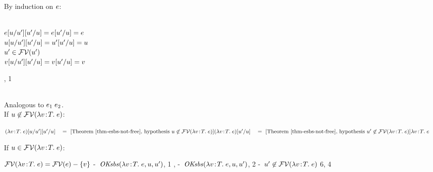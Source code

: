 By induction on $e$:
\begin{bycase}
\Case{$\opO$, $\descopO$, $\pjop{\fnam}$}\\
$e[u/u'][u'/u]=
 e[u'/u]=
 e$
\Case{$\varI$}\\
$u[u/u'][u'/u]=
 u'[u'/u]=
 u$
\\
$u'\in\mathcal{FV}(u')$
\\
$v[u/u'][u'/u]=
 v[u'/u]=
 v$
\Case{$\appO$}
\begin{derivation}
     {, 1}
\steP
{
 \linK{=}
     {}
 \appO}
\end{derivation}
\Case{$\eqO$, $\iifO$}\\
Analogous to $\appO$.
\Case{$\absO$}\\
If $u\not\in\mathcal{FV}(\lambda v\!:\!T.\;e)$:
\begin{links}
$\esbs{\esbsren{(\absO)}}{\varI'}{\varI}
 \link{=}{\thmref{thm-esbs-not-free}, \hyp\ $\varI\not\in\efvar{\absO}$}
 \esbs{(\absO)}{\varI'}{\varI}
 \link{=}{\thmref{thm-esbs-not-free}, \hyp\ $\varI'\not\in\efvar{\absO}$}
 \absO$
\end{links}
\noindent
If $u\in\mathcal{FV}(\lambda v\!:\!T.\;e)$:
\begin{derivation}
\step{\varI\in\efvar{\expr}-\setI{\var}}
     {$\mathcal{FV}(\lambda v\!:\!T.\;e)=\mathcal{FV}(e)-\{v\}$}
     {\hyp\ $\mathit{OKsbs}(\lambda v\!:\!T.\;e,u,u')$, 1}
     {, \hyp\ $\mathit{OKsbs}(\lambda v\!:\!T.\;e,u,u')$, 2}
     {\hyp\ $u'\not\in\mathcal{FV}(\lambda v\!:\!T.\;e)$}
     {6, 4}
\steP
{
 \absO}
\end{derivation}
\end{bycase}



